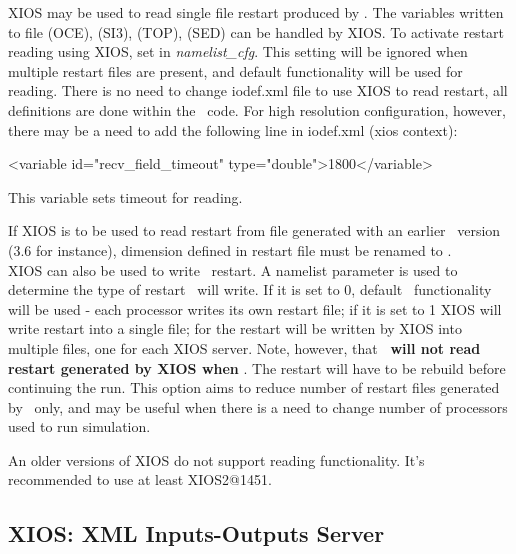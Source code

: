 \documentclass[../main/NEMO_manual]{subfiles}
\begin{document}
XIOS may be used to read single file restart produced by \NEMO. The variables written to
file  (OCE),  (SI3),  (TOP),  (SED) can be handled by XIOS. 
To activate restart reading using XIOS, set 
in \textit{namelist\_cfg}. This setting will be ignored when multiple restart files are present, and default \NEMO
functionality will be used for reading. There is no need to change iodef.xml file to use XIOS to read
restart, all definitions are done within the \NEMO\ code. For high resolution configuration, however,
there may be a need to add the following line in iodef.xml (xios context):

\begin{xmllines}
<variable id="recv_field_timeout"        type="double">1800</variable>
\end{xmllines}

This variable sets timeout for reading.

If XIOS is to be used to read restart from file generated with an earlier \NEMO\ version (3.6 for instance),
dimension  defined in restart file must be renamed to .\\

XIOS can also be used to write \NEMO\ restart. A namelist parameter  is used to determine the
type of restart \NEMO\ will write. If it is set to 0, default \NEMO\ functionality will be used - each
processor writes its own restart file; if it is set to 1 XIOS will write restart into a single file;
for  the restart will be written by XIOS into multiple files, one for each XIOS server.
Note, however, that \textbf{\NEMO\ will not read restart generated by XIOS when }. The restart will
have to be rebuild before continuing the run. This option aims to reduce number of restart files generated by \NEMO\ only,
and may be useful when there is a need to change number of processors used to run simulation.

An older versions of XIOS do not support reading functionality. It's recommended to use at least XIOS2@1451.

\subsection{XIOS: XML Inputs-Outputs Server}
\end{document}
